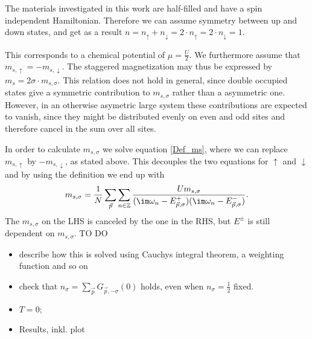 \documentclass[a4paper,10pt]{report}
\begin{document}
The materials investigated in this work are half-filled and have a spin independent Hamiltonian.
Therefore we can assume symmetry between up and down states, and get as a result
$n=n_{\uparrow}+n_{\downarrow}=2\cdot n_{\uparrow}= 2\cdot n_{\downarrow} = 1$.

This corresponds to a chemical potential of 
$\mu=\frac{U}2$.
We furthermore assume that $m_{s,\uparrow}=-m_{s,\downarrow}$. 
The staggered magnetization may thus be expressed by $m_s=2\sigma \cdot m_{s,\sigma}$.
This relation does not hold in general, since double occupied states give a symmetric contribution to $m_{s,\sigma}$ rather than a asymmetric one.
However, in an otherwise asymetric large system these contributions are expected to vanish, since they might be distributed evenly on even and odd sites 
and therefore cancel in the sum over all sites.

In order to calculate $m_ {s,\sigma}$ we solve equation \ref{Def_ms}, where we can replace $m_{s,\uparrow}$ by $-m_{s,\downarrow}$, as stated above.
This decouples the two equations for $\uparrow$ and $\downarrow$ and by using the definition we end up with
\begin{equation}
 m_{s,\sigma} = \frac1N \sum_{\vec{p}} \sum_{n\in \mathbb{Z}} 
							      \frac { Um_{s,\sigma} }
								    { (\im \omega_n - E_{\vec{p},\sigma}^+) (\im \omega_n - E_{\vec{p},\sigma}^-)}.
\end{equation}
The $m_{s,\sigma}$ on the LHS is canceled by the one in the RHS, but $E^{\pm}$ is still dependent on $m_{s,\sigma}$.
%
\newline
  \newline
TO DO
\begin{itemize}
  \item describe how this is solved using Cauchys integral theorem, a weighting function and so on
 \item check that $n_{\sigma}=\sum_{\vec{p}} G_{\vec{p},-\sigma}(0)$ holds, even when $n_{\sigma}=\frac12$ fixed.
 \item $T=0$;
 \item Results, inkl. plot
\end{itemize}
















\end{document}
